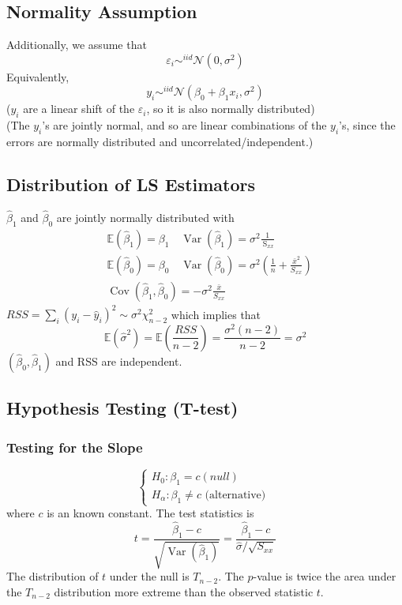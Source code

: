 \documentclass[11pt,a4paper]{article}
\begin{document}
\subsection{Normality Assumption}
Additionally, we assume that$$\varepsilon_i\sim^{iid}\mathcal{N}(0,\sigma^2)$$
Equivalently,$$y_i\sim^{iid}\mathcal{N}(\beta_0+\beta_1x_i,\sigma^2)$$
($y_i$ are a linear shift of the $\varepsilon_i$, so it is also normally distributed)\\
(The $y_i$’s are jointly normal, and so are linear combinations of the $y_i$’s, since the errors are normally distributed and uncorrelated/independent.)

\subsection{Distribution of LS Estimators}
$\hat{\beta}_{1}$ and $\hat{\beta}_{0}$ are jointly normally distributed with
$$
\begin{aligned}
&\mathbb{E}\left(\hat{\beta}_{1}\right)=\beta_{1} \quad \operatorname{Var}\left(\hat{\beta}_{1}\right)=\sigma^{2} \frac{1}{\mathrm{~S}_{x x}} \\
&\mathbb{E}\left(\hat{\beta}_{0}\right)=\beta_{0} \quad \operatorname{Var}\left(\hat{\beta}_{0}\right)=\sigma^{2}\left(\frac{1}{n}+\frac{\bar{x}^{2}}{S_{x x}}\right) \\
&\operatorname{Cov}\left(\hat{\beta}_{1}, \hat{\beta}_{0}\right)=-\sigma^{2} \frac{\bar{x}}{S_{x x}}
\end{aligned}
$$
$R S S=\sum_{i}\left(y_{i}-\hat{y}_{i}\right)^{2} \sim \sigma^{2} \chi_{n-2}^{2}$ which implies that
$$
\mathbb{E}\left(\hat{\sigma}^{2}\right)=\mathbb{E}\left(\frac{R S S}{n-2}\right)=\frac{\sigma^{2}(n-2)}{n-2}=\sigma^{2}
$$
$\left(\hat{\beta}_{0}, \hat{\beta}_{1}\right)$ and RSS are independent.

\subsection{Hypothesis Testing (T-test)}
\subsubsection{Testing for the Slope}
$$
\left\{\begin{array}{l}
H_{0}: \beta_{1}=c(n u l l) \\
H_{\alpha}: \beta_{1} \neq c \text { (alternative) }
\end{array}\right.
$$
where $c$ is an known constant.
The test statistics is
$$
t=\frac{\hat{\beta}_{1}-c}{\sqrt{\operatorname{Var}\left(\hat{\beta}_{1}\right)}}=\frac{\hat{\beta}_{1}-c}{\hat{\sigma} / \sqrt{S_{x x}}}
$$
The distribution of $t$ under the null is $T_{n-2}$.
The $p$-value is twice the area under the $T_{n-2}$ distribution more extreme than the observed statistic $t$.
\end{document}
